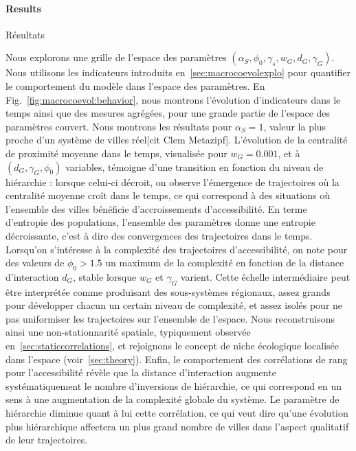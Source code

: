 \paragraph{Results}{Résultats}



Nous explorons une grille de l'espace des paramètres $(\alpha_S,\phi_0,\gamma_s,w_G,d_G,\gamma_G)$. Nous utilisons les indicateurs introduits en~\ref{sec:macrocoevolexplo} pour quantifier le comportement du modèle dans l'espace des paramètres. En Fig.~\ref{fig:macrocoevol:behavior}, nous montrons l'évolution d'indicateurs dans le temps ainsi que des mesures agrégées, pour une grande partie de l'espace des paramètres couvert. Nous montrons les résultats pour $\alpha_S = 1$, valeur la plus proche d'un système de villes réel[cit Clem Metazipf]. L'évolution de la centralité de proximité moyenne dans le temps, visualisée pour $w_G = 0.001$, et à $(d_G,\gamma_G,\phi_0)$ variables, témoigne d'une transition en fonction du niveau de hiérarchie : lorsque celui-ci décroit, on observe l'émergence de trajectoires où la centralité moyenne croît dans le temps, ce qui correspond à des situations où l'ensemble des villes bénéficie d'accroissements d'accessibilité. En terme d'entropie des populations, l'ensemble des paramètres donne une entropie décroissante, c'est à dire des convergences des trajectoires dans le temps. Lorsqu'on s'intéresse à la complexité des trajectoires d'accessibilité, on note pour des valeurs de $\phi_0 > 1.5$ un maximum de la complexité en fonction de la distance d'interaction $d_G$, stable lorsque $w_G$ et $\gamma_G$ varient. Cette échelle intermédiaire peut être interprétée comme produisant des sous-systèmes régionaux, assez grands pour développer chacun un certain niveau de complexité, et assez isolés pour ne pas uniformiser les trajectoires sur l'ensemble de l'espace. Nous reconstruisons ainsi une non-stationnarité spatiale, typiquement observée en~\ref{sec:staticcorrelations}, et rejoignons le concept de niche écologique localisée dans l'espace (voir~\ref{sec:theory}). Enfin, le comportement des corrélations de rang pour l'accessibilité révèle que la distance d'interaction augmente systématiquement le nombre d'inversions de hiérarchie, ce qui correspond en un sens à une augmentation de la complexité globale du système. Le paramètre de hiérarchie diminue quant à lui cette corrélation, ce qui veut dire qu'une évolution plus hiérarchique affectera un plus grand nombre de villes dans l'aspect qualitatif de leur trajectoires.



